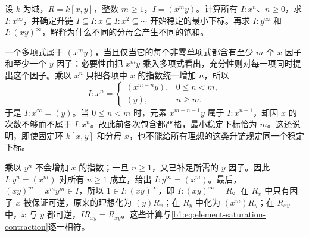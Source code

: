 \begin{exercise}\label{b1:ex:13-14}
	设 \(k\) 为域，\(R=k[x,y]\)，整数 \(m\geq1\)，\(I=(x^my)\)。计算所有 \(I:x^n\)、\(n\geq0\)，求 \(I:x^\infty\)，并确定升链 \(I\subseteq I:x\subseteq I:x^2\subseteq\cdots\) 开始稳定的最小下标。再求 \(I:y^\infty\) 和 \(I:(xy)^\infty\)，解释为什么不同的分母会产生不同的饱和。
\end{exercise}
\begin{solution}
	一个多项式属于 \((x^my)\)，当且仅当它的每个非零单项式都含有至少 \(m\) 个 \(x\) 因子和至少一个 \(y\) 因子：必要性由把 \(x^my\) 乘入多项式看出，充分性则对每一项同时提出这个因子。乘以 \(x^n\) 只把各项中 \(x\) 的指数统一增加 \(n\)，所以
	\[
		I:x^n=
		\begin{cases}
			(x^{m-n}y),&0\leq n<m,\\
			(y),&n\geq m.
		\end{cases}
	\]
	于是 \(I:x^\infty=(y)\)。当 \(0\leq n<m\) 时，元素 \(x^{m-n-1}y\) 属于 \(I:x^{n+1}\)，却因 \(x\) 的次数不够而不属于 \(I:x^n\)。故此前各次包含都严格，最小稳定下标恰为 \(m\)。这还说明，即使固定环 \(k[x,y]\) 和分母 \(x\)，也不能给所有理想的这类升链规定同一个稳定下标。

	乘以 \(y^n\) 不会增加 \(x\) 的指数；一旦 \(n\geq1\)，又已补足所需的 \(y\) 因子。因此 \(I:y^n=(x^m)\) 对所有 \(n\geq1\) 成立，给出 \(I:y^\infty=(x^m)\)。最后，\((xy)^m=x^my^m\in I\)，所以 \(1\in I:(xy)^\infty\)，即 \(I:(xy)^\infty=R\)。在 \(R_x\) 中只有因子 \(x\) 被保证可逆，原来的理想化为 \((y)R_x\)；在 \(R_y\) 中化为 \((x^m)R_y\)；在 \(R_{xy}\) 中，\(x\) 与 \(y\) 都可逆，\(IR_{xy}=R_{xy}\)。这些计算与\eqref{b1:eq:element-saturation-contraction}逐一相符。
\end{solution}

